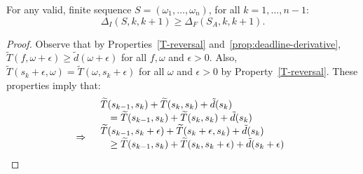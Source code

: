 \begin{property}\label{prop:ascending-dominates-I}
For any valid, finite sequence $S = (\omega_1, \ldots, \omega_n)$, for all $k = 1, \ldots, n-1$:
\begin{equation}\label{eqn:compare-delta-I}
    \Delta_I(S,k,k+1) \geq \Delta_F(S_A, k, k+1).
\end{equation}
\end{property}
\begin{proof}
Observe that by Properties~\ref{T-reversal} and~\ref{prop:deadline-derivative}, $\widetilde{T}(f,\omega + \epsilon) \geq \tilde{d}(\omega + \epsilon)$ for all $f, \omega$ and $\epsilon > 0$.  Also, $\widetilde{T}(s_k +\epsilon, \omega) = \widetilde{T}(\omega, s_k+\epsilon)$ for all $\omega$ and $\epsilon >0$ by Property~\ref{T-reversal}. These properties imply that:
\begin{equation}\label{eqn:change-sk}
\begin{array}{ll}
     & 
     \begin{array}{ll}
        \lefteqn{\widetilde{T}(s_{k-1},s_k) + \widetilde{T}(s_k, s_k) + \tilde{d}(s_k)}& \\
            &= \widetilde{T}(s_{k-1},s_k) + \widetilde{T}(s_k,s_k) + \tilde{d}(s_k)
      \end{array}\\
     \Rightarrow & 
     \begin{array}{ll}
        \lefteqn{\widetilde{T}(s_{k-1},s_k +\epsilon) + \widetilde{T}(s_k+\epsilon, s_k) + \tilde{d}(s_k)}& \\
        &\geq \widetilde{T}(s_{k-1},s_k) + \widetilde{T}(s_k, s_k + \epsilon) + \tilde{d}(s_k+\epsilon) 
    \end{array}\\
\end{array}
\end{equation}


\end{proof}
